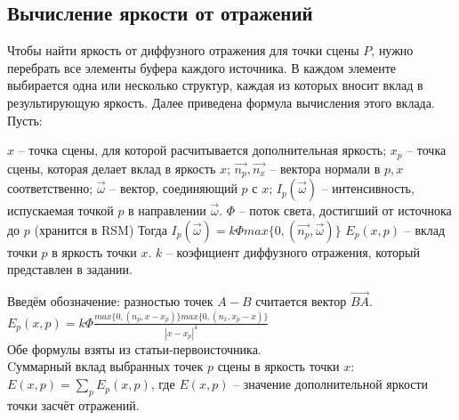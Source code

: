{{        \subsection{Вычисление яркости от отражений} {
            Чтобы найти яркость от диффузного отражения для точки сцены $P$,
            нужно перебрать все элементы буфера каждого источника.
            В каждом элементе выбирается одна или несколько структур,
            каждая из которых вносит вклад в результирующую яркость.
            Далее приведена формула вычисления этого вклада.
            Пусть:
            \begin{enumerate}
                $x$ -- точка сцены, для которой расчитывается дополнительная яркость;
                $x_p$ -- точка сцены, которая делает вклад в яркость $x$;
                $\vec{n_p}, \vec{n_x}$ -- вектора нормали в $p, x$ соответственно;
                $\vec{\omega}$ -- вектор, соединяющий $p$ с $x$;
                $I_p(\vec{\omega})$ -- интенсивность, испускаемая точкой $p$ в
                направлении $\vec{\omega}$.
                $\Phi$ -- поток света, достигший от источнока до $p$ (хранится в RSM)
                Тогда $I_p(\vec{\omega}) = k\Phi max\{0, (\vec{n_p}, \vec{\omega})\}$
                $E_p(x, p)$ -- вклад точки $p$ в яркость точки $x$.
                $k$ -- коэфициент диффузного отражения, который представлен в задании.
            \end{enumerate}
            Введём обозначение: разностью точек $A - B$ считается вектор $\vec{BA}$.
            \\
            $
            E_p(x, p) = k\Phi\frac{ max\{0, (n_p, x - x_p)\}
            max\{0, (n_x, x_p - x)\} }
            {|x - x_p|^4}
            $ \\
            Обе формулы взяты из статьи-первоисточника. \\
            Cуммарный вклад выбранных точек $p$ сцены в яркость точки $x$:
            $E(x, p) = \sum_p E_p(x, p)$, \hspace{3mm} где
            $E(x, p)$ -- значение дополнительной яркости точки засчёт отражений.
        }
}}

